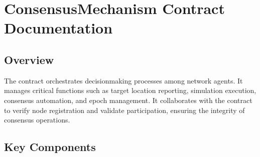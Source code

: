 \documentclass[a4paper,10pt,english]{sphinxmanual}
\begin{document}
\sphinxstepscope


\chapter{ConsensusMechanism Contract Documentation}
\label{\detokenize{docs_consensus_mechanism_contract:consensusmechanism-contract-documentation}}\label{\detokenize{docs_consensus_mechanism_contract::doc}}

\section{Overview}
\label{\detokenize{docs_consensus_mechanism_contract:overview}}
\sphinxAtStartPar
The  contract orchestrates decision\sphinxhyphen{}making processes among network agents. It manages critical functions such as target location reporting, simulation execution, consensus automation, and epoch management. It collaborates with the  contract to verify node registration and validate participation, ensuring the integrity of consensus operations.


\section{Key Components}
\label{\detokenize{docs_consensus_mechanism_contract:key-components}}
\end{document}
